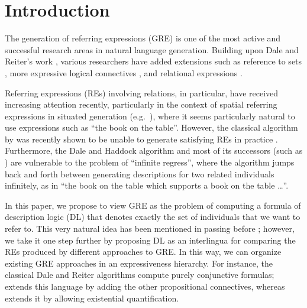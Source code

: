\section{Introduction} \label{sec:introduction}

The generation of referring expressions (GRE) is one of the most
active and successful research areas in natural language generation.
Building upon Dale and Reiter's work \cite{dale89cooking,Dale1995},
various researchers have added extensions such as reference to sets
\cite{Stone2000}, more expressive logical connectives
\cite{deemter02:_gener_refer_expres}, and relational expressions
\cite{dale91:_gener_refer_expres_invol_relat}.

Referring expressions (REs) involving relations, in particular, have
received increasing attention recently, particularly in the context of
spatial referring expressions in situated generation (e.g.\
\cite{kelleher06:_increm_gener_of_spatial_refer}), where it seems
particularly natural to use expressions such as ``the book on the
table''.  However, the classical algorithm by
 was recently shown to
be unable to generate satisfying REs in practice
\cite{viethen06:_algor_for_gener_refer_expres}.  Furthermore, the Dale
and Haddock algorithm and most of its successors (such as
\cite{kelleher06:_increm_gener_of_spatial_refer}) are vulnerable to
the problem of ``infinite regress'', where the algorithm jumps back
and forth between generating descriptions for two related individuals
infinitely, as in ``the book on the table which supports a book on the
table \ldots''.

In this paper, we propose to view GRE as the problem of computing a
formula of description logic (DL) that denotes exactly the set of
individuals that we want to refer to.  This very natural idea has been
mentioned in passing before
\cite{Krahmer2003,gardent07:_gener_bridg_defin_descr}; however, we
take it one step further by proposing DL as an interlingua for
comparing the REs produced by different approaches to GRE.  In this
way, we can organize existing GRE approaches in an expressiveness
hierarchy.  For instance, the classical Dale and Reiter algorithms
compute purely conjunctive formulas;
 extends this language by
adding the other propositional connectives, whereas
 extends it by
allowing existential quantification.

